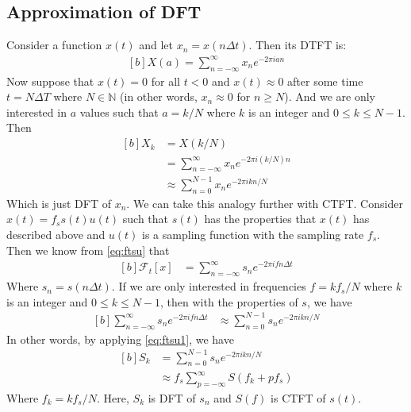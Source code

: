 \documentclass[letterpaper, 11pt]{article}
\newcommand{\fsum}[1]{\sum_{#1 = -\infty}^{\infty}} %
\newcommand{\fourier}[2]{\mathcal{F}_{#1}[#2]} %
\newcommand{\ssum}[1]{\sum_{#1 = 0}^{N - 1}} %
\newcommand{\dft}[3]{\ssum{#1} #2 e^{-2\pi i#3#1/N}} %
\newcommand{\dtft}[3]{\fsum{#1} #2 e^{-2\pi i#3#1}}
\numberwithin{equation}{section}
\numberwithin{figure}{section}
\numberwithin{table}{section}
\begin{document}
\subsection{Approximation of DFT}
Consider a function \(x(t)\) and let \(x_{n} = x(n\Delta t)\). Then its DTFT is:
\begin{equation}
	\begin{aligned}[b]
		X(a) = \dtft{n}{x_{n}}{a} 
	\end{aligned}
\end{equation}
Now suppose that \(x(t) = 0\) for all \(t < 0\) and \(x(t) \approx 0\) after some time \(t = N\Delta T\) where \(N \in \mathbb{N}\) (in other words, \(x_{n} \approx 0\) for \(n \ge N\)). And we are only interested in \(a\) values such that \(a = k/N\) where \(k\) is an integer and \(0 \leq k \leq N - 1\). Then
\begin{equation}
	\begin{aligned}[b]
		X_{k} 	&= X(k/N)\\
			&= \dtft{n}{x_{n}}{(k/N)}\\
			&\approx \dft{n}{x_{n}}{k}
	\end{aligned}
\end{equation}
Which is just DFT of \(x_{n}\). We can take this analogy further with CTFT. Consider \(x(t)=f_{s} s(t)u(t)\) such that \(s(t)\) has the properties that \(x(t)\) has described above and \(u(t)\) is a sampling function with the sampling rate \(f_{s}\). Then we know from \eqref{eq:ftsu} that
\begin{equation}
	\begin{aligned}[b]
		\fourier{t}{x}
			&= \fsum{n} s_{n} e^{-2\pi ifn\Delta t} 
	\end{aligned}
\end{equation}
Where \(s_{n} = s(n\Delta t)\). If we are only interested in frequencies \(f = kf_{s}/N\) where \(k\) is an integer and \(0 \leq k \leq N - 1\), then with the properties of \(s\), we have
\begin{equation}
	\begin{aligned}[b]
		\fsum{n} s_{n} e^{-2\pi ifn\Delta t}
			&\approx \dft{n}{s_{n}}{k}
	\end{aligned}
\end{equation}
In other words, by applying \eqref{eq:ftsu1}, we have
\begin{equation}
	\begin{aligned}[b]
		S_{k}	&= \dft{n}{s_{n}}{k}\\
			&\approx f_{s}\fsum{p} S(f_{k} + pf_{s}) 
	\end{aligned}
\end{equation}
Where \(f_{k} = kf_{s}/N\). Here, \(S_{k}\) is DFT of \(s_{n}\) and \(S(f)\) is CTFT of \(s(t)\).
\clearpage
\pagestyle{plain}
\printbibliography
{}
\printindex
\end{document}
